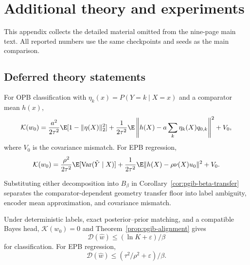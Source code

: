 \section{Additional theory and experiments}
\label{app:additional}

This appendix collects the detailed material omitted from the nine-page main text.
All reported numbers use the same checkpoints and seeds as the main comparison.

\subsection{Deferred theory statements}
\label{app:deferred-theory}

\begin{proposition}
\label{prop:pgib-ambiguity-decomposition}
For OPB classification with $\eta_k(x)=P(Y=k\mid X=x)$ and a comparator mean $h(x)$,
\begin{equation}
\mathcal K(w_0)=\frac{a^2}{2\tau^2}\E[1-\|\eta(X)\|_2^2]
+\frac1{2\tau^2}\E\left\|h(X)-a\sum_k\eta_k(X)q_{0,k}\right\|^2+V_0,
\label{eq:opb-ambiguity-decomposition}
\end{equation}
where $V_0$ is the covariance mismatch. For EPB regression,
\begin{equation}
\mathcal K(w_0)=\frac{\rho^2}{2\tau^2}\E[\operatorname{Var}(\tilde Y\mid X)]
+\frac1{2\tau^2}\E\|h(X)-\rho\nu(X)u_0\|^2+V_0.
\label{eq:epb-ambiguity-decomposition}
\end{equation}
\end{proposition}

Substituting either decomposition into $B_\beta$ in
Corollary~\ref{cor:pgib-beta-transfer} separates the comparator-dependent geometry
transfer floor into label ambiguity, encoder mean approximation, and covariance
mismatch.

\begin{corollary}
\label{cor:pgib-exact-alignment}
Under deterministic labels, exact posterior--prior matching, and a compatible Bayes
head, $\mathcal K(w_0)=0$ and Theorem~\ref{prop:pgib-alignment} gives
\begin{equation}
\mathcal D(\widehat w)\le(\ln K+\varepsilon)/\beta
\label{eq:pgib-alignment}
\end{equation}
for classification. For EPB regression,
\begin{equation}
\mathcal D(\widehat w)\le(\tau^2/\rho^2+\varepsilon)/\beta.
\label{eq:pgib-alignment-regression}
\end{equation}
\end{corollary}

